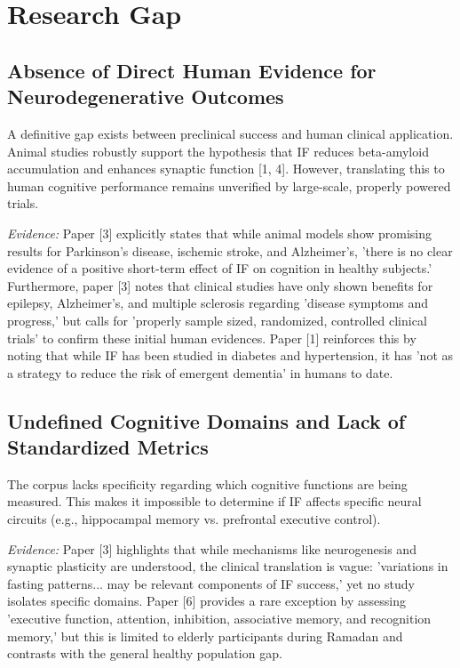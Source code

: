 \documentclass[11pt]{article}
\begin{document}
\section{Research Gap}
\subsection{Absence of Direct Human Evidence for Neurodegenerative Outcomes}
A definitive gap exists between preclinical success and human clinical application. Animal studies robustly support the hypothesis that IF reduces beta-amyloid accumulation and enhances synaptic function [1, 4]. However, translating this to human cognitive performance remains unverified by large-scale, properly powered trials.

\textit{Evidence:} Paper [3] explicitly states that while animal models show promising results for Parkinson's disease, ischemic stroke, and Alzheimer's, 'there is no clear evidence of a positive short-term effect of IF on cognition in healthy subjects.' Furthermore, paper [3] notes that clinical studies have only shown benefits for epilepsy, Alzheimer's, and multiple sclerosis regarding 'disease symptoms and progress,' but calls for 'properly sample sized, randomized, controlled clinical trials' to confirm these initial human evidences. Paper [1] reinforces this by noting that while IF has been studied in diabetes and hypertension, it has 'not as a strategy to reduce the risk of emergent dementia' in humans to date.

\subsection{Undefined Cognitive Domains and Lack of Standardized Metrics}
The corpus lacks specificity regarding which cognitive functions are being measured. This makes it impossible to determine if IF affects specific neural circuits (e.g., hippocampal memory vs. prefrontal executive control).

\textit{Evidence:} Paper [3] highlights that while mechanisms like neurogenesis and synaptic plasticity are understood, the clinical translation is vague: 'variations in fasting patterns... may be relevant components of IF success,' yet no study isolates specific domains. Paper [6] provides a rare exception by assessing 'executive function, attention, inhibition, associative memory, and recognition memory,' but this is limited to elderly participants during Ramadan and contrasts with the general healthy population gap.
\end{document}
